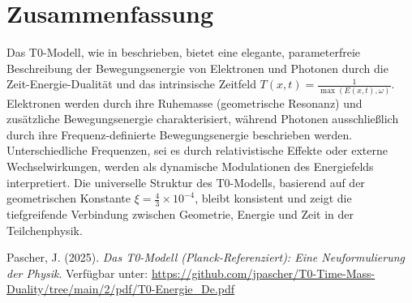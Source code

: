 \documentclass[12pt,a4paper]{article}
\begin{document}
	\section{Zusammenfassung}
	\label{sec:summary}
	
	Das T0-Modell, wie in \cite{pascher_t0_energie_2025} beschrieben, bietet eine elegante, parameterfreie Beschreibung der Bewegungsenergie von Elektronen und Photonen durch die Zeit-Energie-Dualität und das intrinsische Zeitfeld \( T(x,t) = \frac{1}{\max(E(x,t), \omega)} \). Elektronen werden durch ihre Ruhemasse (geometrische Resonanz) und zusätzliche Bewegungsenergie charakterisiert, während Photonen ausschließlich durch ihre Frequenz-definierte Bewegungsenergie beschrieben werden. Unterschiedliche Frequenzen, sei es durch relativistische Effekte oder externe Wechselwirkungen, werden als dynamische Modulationen des Energiefelds interpretiert. Die universelle Struktur des T0-Modells, basierend auf der geometrischen Konstante \(\xi = \frac{4}{3} \times 10^{-4}\), bleibt konsistent und zeigt die tiefgreifende Verbindung zwischen Geometrie, Energie und Zeit in der Teilchenphysik.
	
	\newpage
	\begin{thebibliography}{9}
		Pascher, J. (2025). \textit{Das T0-Modell (Planck-Referenziert): Eine Neuformulierung der Physik}. Verfügbar unter: \url{https://github.com/jpascher/T0-Time-Mass-Duality/tree/main/2/pdf/T0-Energie_De.pdf}
	\end{thebibliography}
	
\end{document}
